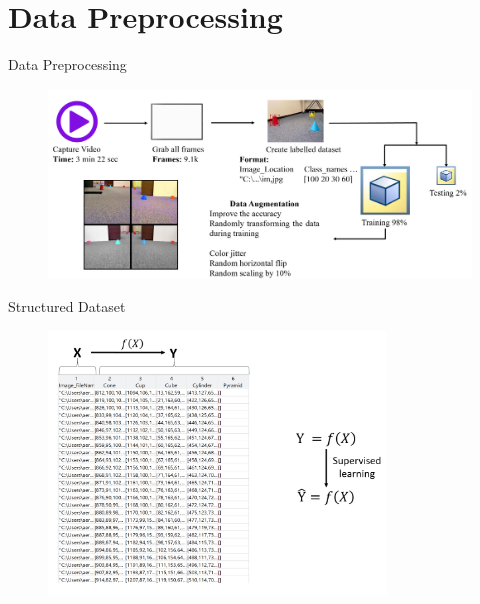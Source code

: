 \documentclass[10pt]{beamer}
\begin{document}


\section{Data Preprocessing}

\begin{frame}{Data Preprocessing}
    \begin{figure}
        \centering
        \includegraphics[width=1\textwidth]{Images/datapreprocess.png}
    \end{figure}  
\end{frame}

\begin{frame}{Structured Dataset}
    \begin{figure}
        \centering
        \includegraphics[width=0.8\textwidth]{Images/structureddata.png}
    \end{figure}  
\end{frame}

\end{document}
